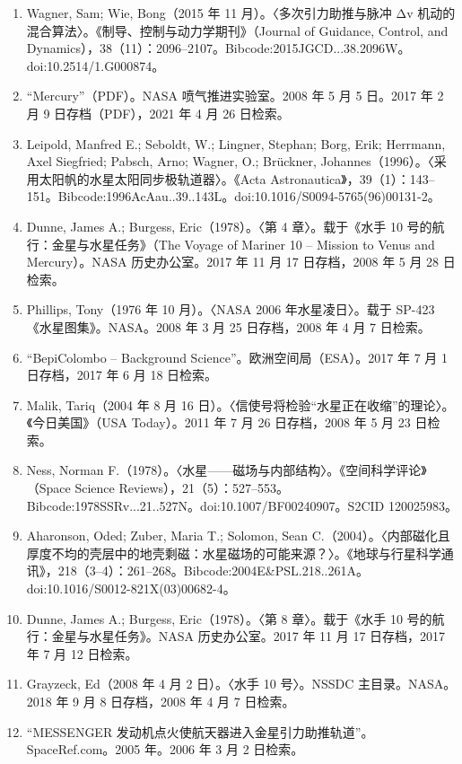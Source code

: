 \begin{enumerate}
    \item Wagner, Sam; Wie, Bong（2015 年 11 月）。〈多次引力助推与脉冲 Δv 机动的混合算法〉。《制导、控制与动力学期刊》（Journal of Guidance, Control, and Dynamics），38（11）：2096–2107。Bibcode:2015JGCD...38.2096W。doi:10.2514/1.G000874。
    \item “Mercury”（PDF）。NASA 喷气推进实验室。2008 年 5 月 5 日。2017 年 2 月 9 日存档（PDF），2021 年 4 月 26 日检索。
    \item Leipold, Manfred E.; Seboldt, W.; Lingner, Stephan; Borg, Erik; Herrmann, Axel Siegfried; Pabsch, Arno; Wagner, O.; Brückner, Johannes（1996）。〈采用太阳帆的水星太阳同步极轨道器〉。《Acta Astronautica》，39（1）：143–151。Bibcode:1996AcAau..39..143L。doi:10.1016/S0094-5765(96)00131-2。
    \item Dunne, James A.; Burgess, Eric（1978）。〈第 4 章〉。载于《水手 10 号的航行：金星与水星任务》（The Voyage of Mariner 10 – Mission to Venus and Mercury）。NASA 历史办公室。2017 年 11 月 17 日存档，2008 年 5 月 28 日检索。
    \item Phillips, Tony（1976 年 10 月）。〈NASA 2006 年水星凌日〉。载于 SP-423《水星图集》。NASA。2008 年 3 月 25 日存档，2008 年 4 月 7 日检索。
    \item “BepiColombo – Background Science”。欧洲空间局（ESA）。2017 年 7 月 1 日存档，2017 年 6 月 18 日检索。
    \item Malik, Tariq（2004 年 8 月 16 日）。〈信使号将检验“水星正在收缩”的理论〉。《今日美国》（USA Today）。2011 年 7 月 26 日存档，2008 年 5 月 23 日检索。
    \item Ness, Norman F.（1978）。〈水星——磁场与内部结构〉。《空间科学评论》（Space Science Reviews），21（5）：527–553。Bibcode:1978SSRv...21..527N。doi:10.1007/BF00240907。S2CID 120025983。
    \item Aharonson, Oded; Zuber, Maria T.; Solomon, Sean C.（2004）。〈内部磁化且厚度不均的壳层中的地壳剩磁：水星磁场的可能来源？〉。《地球与行星科学通讯》，218（3–4）：261–268。Bibcode:2004E&PSL.218..261A。doi:10.1016/S0012-821X(03)00682-4。
    \item Dunne, James A.; Burgess, Eric（1978）。〈第 8 章〉。载于《水手 10 号的航行：金星与水星任务》。NASA 历史办公室。2017 年 11 月 17 日存档，2017 年 7 月 12 日检索。
    \item  Grayzeck, Ed（2008 年 4 月 2 日）。〈水手 10 号〉。NSSDC 主目录。NASA。2018 年 9 月 8 日存档，2008 年 4 月 7 日检索。
    \item “MESSENGER 发动机点火使航天器进入金星引力助推轨道”。SpaceRef.com。2005 年。2006 年 3 月 2 日检索。

\end{enumerate}
